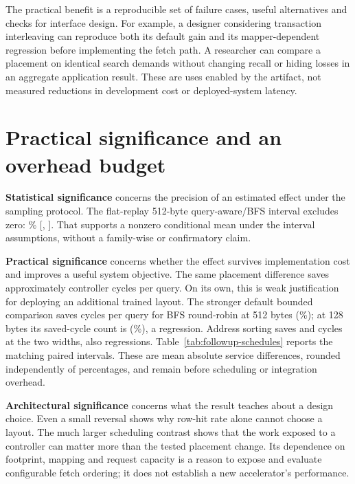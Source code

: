 \documentclass[11pt,a4paper]{report}
\begin{document}
The practical benefit is a reproducible set of failure cases, useful alternatives and checks for interface design. For example, a designer considering transaction interleaving can reproduce both its default gain and its mapper-dependent regression before implementing the fetch path. A researcher can compare a placement on identical search demands without changing recall or hiding losses in an aggregate application result. These are uses enabled by the artifact, not measured reductions in development cost or deployed-system latency.


\section{Practical significance and an overhead budget}
\label{sec:overhead}
\textbf{Statistical significance} concerns the precision of an estimated effect under the sampling protocol. The flat-replay 512-byte query-aware/BFS interval excludes zero: \QADeltaFloat\% [\QALowFloat, \QAHighFloat]. That supports a nonzero conditional mean under the interval assumptions, without a family-wise or confirmatory claim.

\textbf{Practical significance} concerns whether the effect survives implementation cost and improves a useful system objective. The same placement difference saves approximately \SavedCyclesPerQuery{} controller cycles per query. On its own, this is weak justification for deploying an additional trained layout. The stronger default bounded comparison saves \RoundRobinBFSSavedFloat{} cycles per query for BFS round-robin at 512 bytes (\RoundRobinBFSMeanFloat\%); at 128 bytes its saved-cycle count is \RoundRobinBFSSavedCompact{} (\RoundRobinBFSMeanCompact\%), a regression. Address sorting saves \SortedBFSSavedFloat{} and \SortedBFSSavedCompact{} cycles at the two widths, also regressions. Table~\ref{tab:followup-schedules} reports the matching paired intervals. These are mean absolute service differences, rounded independently of percentages, and remain before scheduling or integration overhead.

\textbf{Architectural significance} concerns what the result teaches about a design choice. Even a small reversal shows why row-hit rate alone cannot choose a layout. The much larger scheduling contrast shows that the work exposed to a controller can matter more than the tested placement change. Its dependence on footprint, mapping and request capacity is a reason to expose and evaluate configurable fetch ordering; it does not establish a new accelerator's performance.
\end{document}
